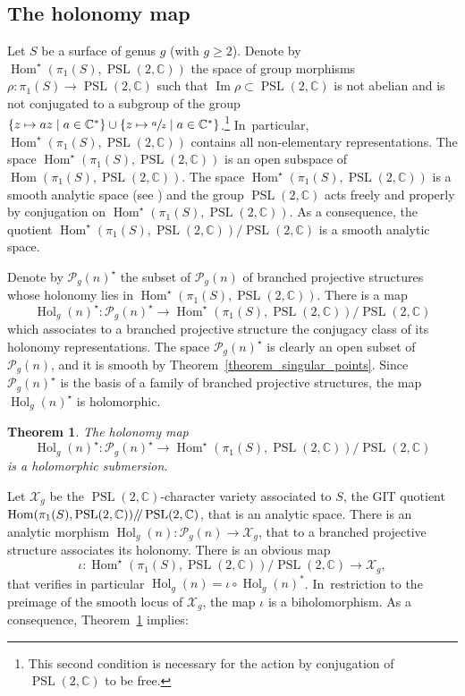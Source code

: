 \documentclass[JEP,XML,SOM,Unicode,NoEqCountersInSection,published]{cedram}
\newcommand\mto{\mathchoice{\longmapsto}{\mapsto}{\mapsto}{\mapsto}}
\newcommand{\C}{\mathbb C}
\DeclareMathOperator{\Hol}{Hol}
\DeclareMathOperator{\Hom}{Hom}
\DeclareMathOperator{\Image}{Im}
\DeclareMathOperator{\PSL}{PSL}
\theoremstyle{definition}
\theoremstyle{plain}
\newtheorem{theorem}[definition]{Theorem}
\begin{document}
\subsection{The holonomy map}

Let $S$ be a surface of genus $g$ (with $g \ge 2$).
Denote by $\Hom^{\star}(\pi_1(S), \PSL(2, \C))$ the space of group morphisms $\rho: \pi_1(S) \to \PSL(2, \C)$ such that $\Image \rho \subset \PSL(2, \C)$ is not abelian and is not conjugated to a subgroup of the group $\{z \mto az\mid a \in \C^*\} \cup\{z \mto \sfrac az \mid a \in \C^*\}$.\footnote{This second condition is necessary for the action by conjugation of $\PSL(2, \C)$ to be free.} In~particular, $\Hom^{\star}(\pi_1(S), \PSL(2, \C))$ contains all non-elementary representations.
The space $\Hom^{\star}(\pi_1(S), \PSL(2, \C))$ is an open subspace of $\Hom(\pi_1(S), \PSL(2, \C))$.
The space $\Hom^{\star}(\pi_1(S), \PSL(2, \C))$ is a smooth analytic space (see \cite{hubbard}) and the group $\PSL(2, \C)$ acts freely and properly by conjugation on $\Hom^{\star}(\pi_1(S), \PSL(2, \C))$.
As a consequence, the quotient $\Hom^{\star}(\pi_1(S), \PSL(2, \C)) / \PSL(2, \C)$ is a smooth analytic space.

Denote by $\mathcal P_g(n)^{\star}$ the subset of $\mathcal P_g(n)$ of branched projective structures whose holonomy lies in $\Hom^{\star}(\pi_1(S), \PSL(2, \C))$.
There is a map
\[
\Hol_g(n)^{\star}: \mathcal P_g(n)^{\star} \to \Hom^{\star}(\pi_1(S), \PSL(2, \C))/\PSL(2, \C)
\]
which associates to a branched projective structure the conjugacy class of its holonomy representations.
The space $\mathcal P_g(n)^{\star}$ is clearly an open subset of $\mathcal P_g(n)$, and it is smooth by Theorem~\ref{theorem_singular_points}.
Since $\mathcal P_g(n)^{\star}$ is the basis of a family of branched projective structures, the map $\Hol_g(n)^{\star}$ is holomorphic.

\begin{theorem}\label{theorem_holonomy}
The holonomy map
\[
\Hol_g(n)^{\star}: \mathcal P_g(n)^{\star} \to \Hom^{\star}(\pi_1(S), \PSL(2, \C))/\PSL(2, \C)
\]
is a holomorphic submersion.
\end{theorem}

Let $\mathcal X_g$ be the $\PSL(2, \C)$-character variety associated to $S$, \ie the GIT quotient $\Hom(\pi_1(S), \PSL(2, \C)) /\mkern-4mu/ \PSL(2, \C)$, that is an analytic space.
There is an analytic morphism $\Hol_g(n): \mathcal P_g(n) \to \mathcal X_g$, that to a branched projective structure associates its holonomy.
There is an obvious map
\[
\iota: \Hom^{\star}(\pi_1(S), \PSL(2, \C))/\PSL(2, \C) \to \mathcal X_g,
\]
that verifies in particular $\Hol_g(n) = \iota \circ \Hol_g(n)^*$. In~restriction to the preimage of the smooth locus of $\mathcal X_g$, the map $\iota$ is a biholomorphism.
As a consequence, Theorem~\ref{theorem_holonomy} implies:
\end{document}
